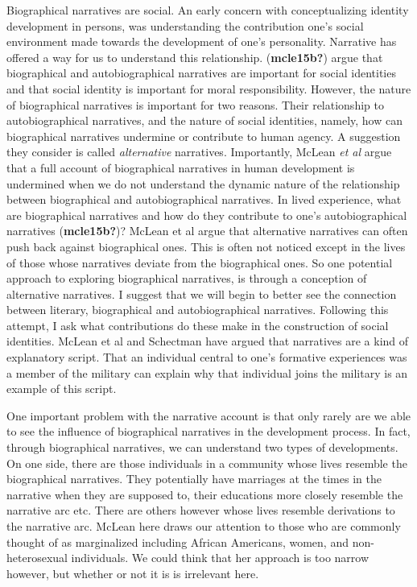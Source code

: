\documentclass[12pt]{book}
\theoremstyle{definition}
\theoremstyle{remark}
\begin{document}
Biographical narratives are social. An early concern with conceptualizing identity development in persons, was understanding the contribution one's social environment made towards the development of one's personality. Narrative has offered a way for us to understand this relationship. (\textbf{mcle15b?}) argue that biographical and autobiographical narratives are important for social identities and that social identity is important for moral responsibility. However, the nature of biographical narratives is important for two reasons. Their relationship to autobiographical narratives, and the nature of social identities, namely, how can biographical narratives undermine or contribute to human agency. A suggestion they consider is called \emph{alternative} narratives. Importantly, McLean \emph{et al} argue that a full account of biographical narratives in human development is undermined when we do not understand the dynamic nature of the relationship between biographical and autobiographical narratives. In lived experience, what are biographical narratives and how do they contribute to one's autobiographical narratives (\textbf{mcle15b?})? McLean et al argue that alternative narratives can often push back against biographical ones. This is often not noticed except in the lives of those whose narratives deviate from the biographical ones. So one potential approach to exploring biographical narratives, is through a conception of alternative narratives. I suggest that we will begin to better see the connection between literary, biographical and autobiographical narratives. Following this attempt, I ask what contributions do these make in the construction of social identities. McLean et al and Schectman have argued that narratives are a kind of explanatory script. That an individual central to one's formative experiences was a member of the military can explain why that individual joins the military is an example of this script.

One important problem with the narrative account is that only rarely are we able to see the influence of biographical narratives in the development process. In fact, through biographical narratives, we can understand two types of developments. On one side, there are those individuals in a community whose lives resemble the biographical narratives. They potentially have marriages at the times in the narrative when they are supposed to, their educations more closely resemble the narrative arc etc. There are others however whose lives resemble derivations to the narrative arc. McLean here draws our attention to those who are commonly thought of as marginalized including African Americans, women, and non-heterosexual individuals. We could think that her approach is too narrow however, but whether or not it is is irrelevant here.
\end{document}
